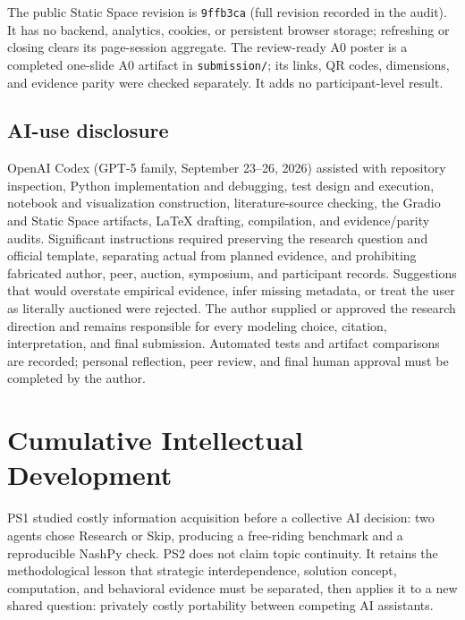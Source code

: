 The public Static Space revision is \texttt{9ffb3ca} (full revision recorded in the audit). It has no backend, analytics, cookies, or persistent browser storage; refreshing or closing clears its page-session aggregate. The review-ready A0 poster is a completed one-slide A0 artifact in \texttt{submission/}; its links, QR codes, dimensions, and evidence parity were checked separately. It adds no participant-level result.

\subsection{AI-use disclosure}
OpenAI Codex (GPT-5 family, September 23--26, 2026) assisted with repository inspection, Python implementation and debugging, test design and execution, notebook and visualization construction, literature-source checking, the Gradio and Static Space artifacts, LaTeX drafting, compilation, and evidence/parity audits. Significant instructions required preserving the research question and official template, separating actual from planned evidence, and prohibiting fabricated author, peer, auction, symposium, and participant records. Suggestions that would overstate empirical evidence, infer missing metadata, or treat the user as literally auctioned were rejected. The author supplied or approved the research direction and remains responsible for every modeling choice, citation, interpretation, and final submission. Automated tests and artifact comparisons are recorded; personal reflection, peer review, and final human approval must be completed by the author.

\section{Cumulative Intellectual Development}
PS1 studied costly information acquisition before a collective AI decision: two agents chose Research or Skip, producing a free-riding benchmark and a reproducible NashPy check. PS2 does not claim topic continuity. It retains the methodological lesson that strategic interdependence, solution concept, computation, and behavioral evidence must be separated, then applies it to a new shared question: privately costly portability between competing AI assistants.

